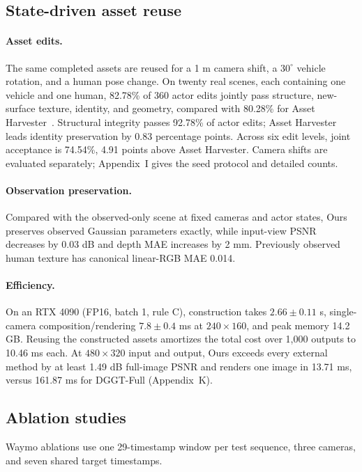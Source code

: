 \subsection{State-driven asset reuse}
\label{sec:ablation-reuse}
\paragraph{Asset edits.}
The same completed assets are reused for a 1 m camera shift, a $30^\circ$ vehicle rotation, and a human pose change. On twenty real scenes, each containing one vehicle and one human, 82.78\% of 360 actor edits jointly pass structure, new-surface texture, identity, and geometry, compared with 80.28\% for Asset Harvester~\cite{cao2026assetharvester}. Structural integrity passes 92.78\% of actor edits; Asset Harvester leads identity preservation by 0.83 percentage points. Across six edit levels, joint acceptance is 74.54\%, 4.91 points above Asset Harvester. Camera shifts are evaluated separately; Appendix~I gives the seed protocol and detailed counts.

\paragraph{Observation preservation.}
\label{sec:observation-preservation}
Compared with the observed-only scene at fixed cameras and actor states, Ours preserves observed Gaussian parameters exactly, while input-view PSNR decreases by 0.03 dB and depth MAE increases by 2 mm. Previously observed human texture has canonical linear-RGB MAE 0.014.

\paragraph{Efficiency.}
On an RTX 4090 (FP16, batch 1, rule C), construction takes $2.66\pm0.11$ s, single-camera composition/rendering $7.8\pm0.4$ ms at $240\times160$, and peak memory 14.2 GB. Reusing the constructed assets amortizes the total cost over 1,000 outputs to 10.46 ms each. At $480\times320$ input and output, Ours exceeds every external method by at least 1.49 dB full-image PSNR and renders one image in 13.71 ms, versus 161.87 ms for DGGT-Full (Appendix~K).

\subsection{Ablation studies}
\label{sec:ablation-protocol}\label{sec:ablations}\label{sec:ablation-studies}
Waymo ablations use one 29-timestamp window per test sequence, three cameras, and seven shared target timestamps.

